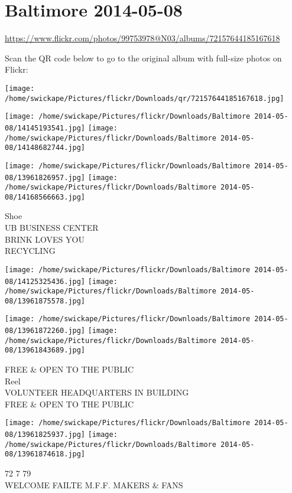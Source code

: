 \documentclass[10pt,letterpaper]{article}
\title{}
\author{}
\date{}
\begin{document}
\section*{Baltimore 2014-05-08}

\url{https://www.flickr.com/photos/99753978@N03/albums/72157644185167618}

Scan the QR code below to go to the original album with full-size photos on Flickr:

\texttt{[image: /home/swickape/Pictures/flickr/Downloads/qr/72157644185167618.jpg]}
\pagebreak

\texttt{[image: /home/swickape/Pictures/flickr/Downloads/Baltimore 2014-05-08/14145193541.jpg]}
\texttt{[image: /home/swickape/Pictures/flickr/Downloads/Baltimore 2014-05-08/14148682744.jpg]}

\texttt{[image: /home/swickape/Pictures/flickr/Downloads/Baltimore 2014-05-08/13961826957.jpg]}
\texttt{[image: /home/swickape/Pictures/flickr/Downloads/Baltimore 2014-05-08/14168566663.jpg]}

Shoe\\
UB BUSINESS CENTER\\
BRINK LOVES YOU\\
RECYCLING
\pagebreak

\texttt{[image: /home/swickape/Pictures/flickr/Downloads/Baltimore 2014-05-08/14125325436.jpg]}
\texttt{[image: /home/swickape/Pictures/flickr/Downloads/Baltimore 2014-05-08/13961875578.jpg]}

\texttt{[image: /home/swickape/Pictures/flickr/Downloads/Baltimore 2014-05-08/13961872260.jpg]}
\texttt{[image: /home/swickape/Pictures/flickr/Downloads/Baltimore 2014-05-08/13961843689.jpg]}

FREE \& OPEN TO THE PUBLIC\\
Reel\\
VOLUNTEER HEADQUARTERS IN BUILDING\\
FREE \& OPEN TO THE PUBLIC
\pagebreak

\texttt{[image: /home/swickape/Pictures/flickr/Downloads/Baltimore 2014-05-08/13961825937.jpg]}
\texttt{[image: /home/swickape/Pictures/flickr/Downloads/Baltimore 2014-05-08/13961874618.jpg]}

72 7 79\\
WELCOME FAILTE M.F.F. MAKERS \& FANS
\pagebreak
\end{document}
